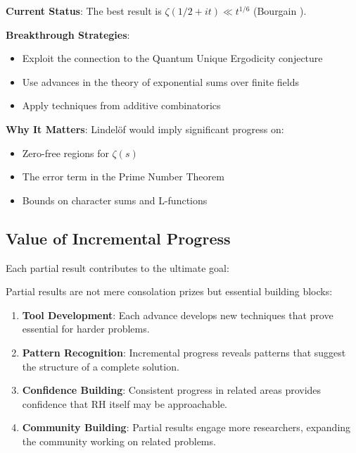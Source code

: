 \begin{research_direction}
\textbf{Current Status}: The best result is $\zeta(1/2 + it) \ll t^{1/6}$ (Bourgain \cite{bourgain2014}).

\textbf{Breakthrough Strategies}:
\begin{itemize}
\item Exploit the connection to the Quantum Unique Ergodicity conjecture
\item Use advances in the theory of exponential sums over finite fields
\item Apply techniques from additive combinatorics
\end{itemize}

\textbf{Why It Matters}: Lindelöf would imply significant progress on:
\begin{itemize}
\item Zero-free regions for $\zeta(s)$
\item The error term in the Prime Number Theorem
\item Bounds on character sums and L-functions
\end{itemize}
\end{research_direction}

\subsection{Value of Incremental Progress}
\label{subsec:incremental_value}

Each partial result contributes to the ultimate goal:

\begin{insight}
Partial results are not mere consolation prizes but essential building blocks:
\begin{enumerate}
\item \textbf{Tool Development}: Each advance develops new techniques that prove essential for harder problems.

\item \textbf{Pattern Recognition}: Incremental progress reveals patterns that suggest the structure of a complete solution.

\item \textbf{Confidence Building}: Consistent progress in related areas provides confidence that RH itself may be approachable.

\item \textbf{Community Building}: Partial results engage more researchers, expanding the community working on related problems.
\end{enumerate}
\end{insight}

